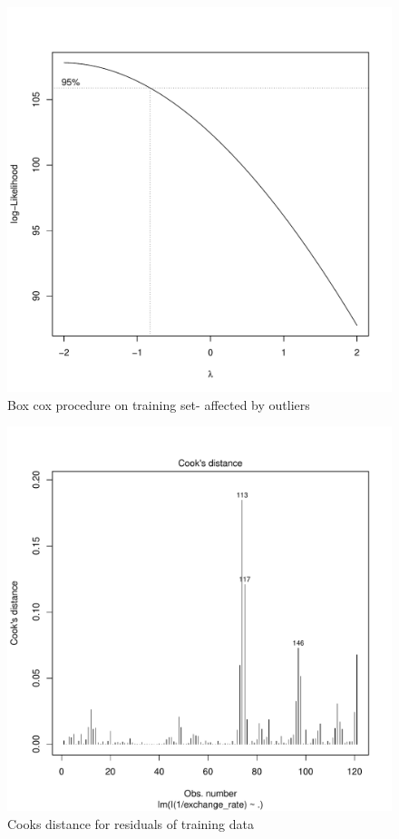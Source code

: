 \documentclass[12pt]{article}
\begin{document}
\begin{figure}
  \centering
    \includegraphics{boxcox.pdf}
  \caption{Box cox procedure on training set- affected by outliers}
  \label{fig:boxcox}
\end{figure}

\begin{figure}
  \centering
    \includegraphics{cooks.pdf}
  \caption{Cooks distance for residuals of training data}
  \label{fig:cooks}
\end{figure}
\end{document}
